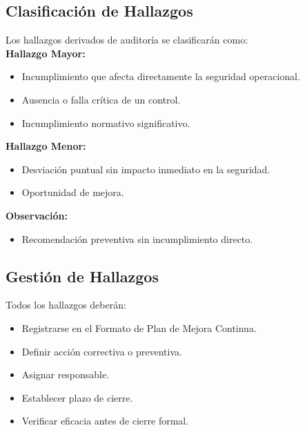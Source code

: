 \subsection{Clasificación de Hallazgos}

Los hallazgos derivados de auditoría se clasificarán como:\\

\textbf{Hallazgo Mayor:}

\begin{itemize}
    \item Incumplimiento que afecta directamente la seguridad operacional.

    \item Ausencia o falla crítica de un control.

    \item Incumplimiento normativo significativo.
\end{itemize}

\textbf{Hallazgo Menor:}

\begin{itemize}
    \item Desviación puntual sin impacto inmediato en la seguridad.

    \item Oportunidad de mejora.
\end{itemize}

\textbf{Observación:}

\begin{itemize}
    \item Recomendación preventiva sin incumplimiento directo.
\end{itemize}

\subsection{Gestión de Hallazgos}
Todos los hallazgos deberán:

\begin{itemize}
    \item Registrarse en el Formato de Plan de Mejora Continua.

    \item Definir acción correctiva o preventiva.

    \item Asignar responsable.

    \item Establecer plazo de cierre.

    \item Verificar eficacia antes de cierre formal.
\end{itemize}

